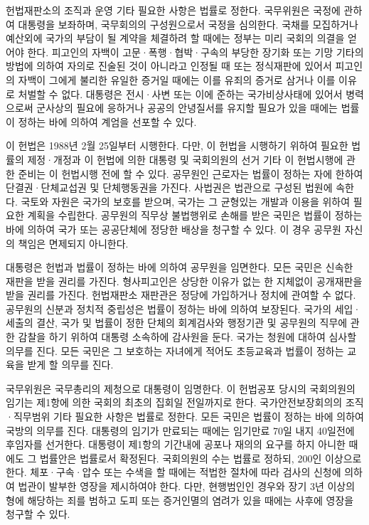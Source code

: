 \documentclass[master, korean]{pnuthesis}
\begin{document}
헌법재판소의 조직과 운영 기타 필요한 사항은 법률로 정한다. 국무위원은 국정에 관하여 대통령을 보좌하며, 국무회의의 구성원으로서 국정을 심의한다. 국채를 모집하거나 예산외에 국가의 부담이 될 계약을 체결하려 할 때에는 정부는 미리 국회의 의결을 얻어야 한다. 피고인의 자백이 고문·폭행·협박·구속의 부당한 장기화 또는 기망 기타의 방법에 의하여 자의로 진술된 것이 아니라고 인정될 때 또는 정식재판에 있어서 피고인의 자백이 그에게 불리한 유일한 증거일 때에는 이를 유죄의 증거로 삼거나 이를 이유로 처벌할 수 없다. 대통령은 전시·사변 또는 이에 준하는 국가비상사태에 있어서 병력으로써 군사상의 필요에 응하거나 공공의 안녕질서를 유지할 필요가 있을 때에는 법률이 정하는 바에 의하여 계엄을 선포할 수 있다.

이 헌법은 1988년 2월 25일부터 시행한다. 다만, 이 헌법을 시행하기 위하여 필요한 법률의 제정·개정과 이 헌법에 의한 대통령 및 국회의원의 선거 기타 이 헌법시행에 관한 준비는 이 헌법시행 전에 할 수 있다. 공무원인 근로자는 법률이 정하는 자에 한하여 단결권·단체교섭권 및 단체행동권을 가진다. 사법권은 법관으로 구성된 법원에 속한다. 국토와 자원은 국가의 보호를 받으며, 국가는 그 균형있는 개발과 이용을 위하여 필요한 계획을 수립한다. 공무원의 직무상 불법행위로 손해를 받은 국민은 법률이 정하는 바에 의하여 국가 또는 공공단체에 정당한 배상을 청구할 수 있다. 이 경우 공무원 자신의 책임은 면제되지 아니한다.

대통령은 헌법과 법률이 정하는 바에 의하여 공무원을 임면한다. 모든 국민은 신속한 재판을 받을 권리를 가진다. 형사피고인은 상당한 이유가 없는 한 지체없이 공개재판을 받을 권리를 가진다. 헌법재판소 재판관은 정당에 가입하거나 정치에 관여할 수 없다. 공무원의 신분과 정치적 중립성은 법률이 정하는 바에 의하여 보장된다. 국가의 세입·세출의 결산, 국가 및 법률이 정한 단체의 회계검사와 행정기관 및 공무원의 직무에 관한 감찰을 하기 위하여 대통령 소속하에 감사원을 둔다. 국가는 청원에 대하여 심사할 의무를 진다. 모든 국민은 그 보호하는 자녀에게 적어도 초등교육과 법률이 정하는 교육을 받게 할 의무를 진다.

국무위원은 국무총리의 제청으로 대통령이 임명한다. 이 헌법공포 당시의 국회의원의 임기는 제1항에 의한 국회의 최초의 집회일 전일까지로 한다. 국가안전보장회의의 조직·직무범위 기타 필요한 사항은 법률로 정한다. 모든 국민은 법률이 정하는 바에 의하여 국방의 의무를 진다. 대통령의 임기가 만료되는 때에는 임기만료 70일 내지 40일전에 후임자를 선거한다. 대통령이 제1항의 기간내에 공포나 재의의 요구를 하지 아니한 때에도 그 법률안은 법률로서 확정된다. 국회의원의 수는 법률로 정하되, 200인 이상으로 한다. 체포·구속·압수 또는 수색을 할 때에는 적법한 절차에 따라 검사의 신청에 의하여 법관이 발부한 영장을 제시하여야 한다. 다만, 현행범인인 경우와 장기 3년 이상의 형에 해당하는 죄를 범하고 도피 또는 증거인멸의 염려가 있을 때에는 사후에 영장을 청구할 수 있다.
\end{document}
